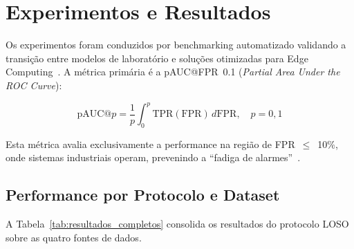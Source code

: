 \section{Experimentos e Resultados}
\color{black}

Os experimentos foram conduzidos por benchmarking automatizado validando a transição entre modelos de
laboratório e soluções otimizadas para Edge Computing~\cite{Uzel2026, Khamaisi2025}. A métrica
primária é a pAUC@FPR~0.1 (\textit{Partial Area Under the ROC Curve}):

\begin{equation}
\text{pAUC}@p = \frac{1}{p}\int_0^p \text{TPR}(\text{FPR})\,d\text{FPR}, \quad p = 0{,}1
\label{eq:pauc}
\end{equation}

\noindent Esta métrica avalia exclusivamente a performance na região de FPR~$\le$~10\%, onde sistemas
industriais operam, prevenindo a ``fadiga de alarmes''~\cite{Nishida2025, Khamaisi2025}.

\subsection{Performance por Protocolo e Dataset}

A Tabela~\ref{tab:resultados_completos} consolida os resultados do protocolo LOSO sobre as quatro
fontes de dados.

\begin{table}[H]
\centering
\footnotesize
{}
\caption{pAUC@0.1 por protocolo e dataset (protocolo LOSO).}
\label{tab:resultados_completos}
\end{table}

